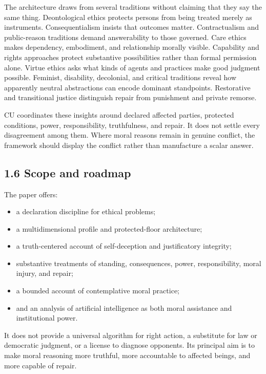 \documentclass[
  11pt,
]{article}
\providecommand{\tightlist}{%
  \setlength{\itemsep}{0pt}\setlength{\parskip}{0pt}}
\begin{document}
The architecture draws from several traditions without claiming that
they say the same thing. Deontological ethics protects persons from
being treated merely as instruments. Consequentialism insists that
outcomes matter. Contractualism and public-reason traditions demand
answerability to those governed. Care ethics makes dependency,
embodiment, and relationship morally visible. Capability and rights
approaches protect substantive possibilities rather than formal
permission alone. Virtue ethics asks what kinds of agents and practices
make good judgment possible. Feminist, disability, decolonial, and
critical traditions reveal how apparently neutral abstractions can
encode dominant standpoints. Restorative and transitional justice
distinguish repair from punishment and private remorse.

CU coordinates these insights around declared affected parties,
protected conditions, power, responsibility, truthfulness, and repair.
It does not settle every disagreement among them. Where moral reasons
remain in genuine conflict, the framework should display the conflict
rather than manufacture a scalar answer.

\subsection{1.6 Scope and roadmap}\label{scope-and-roadmap}

The paper offers:

\begin{itemize}
\tightlist
\item
  a declaration discipline for ethical problems;
\item
  a multidimensional profile and protected-floor architecture;
\item
  a truth-centered account of self-deception and justificatory
  integrity;
\item
  substantive treatments of standing, consequences, power,
  responsibility, moral injury, and repair;
\item
  a bounded account of contemplative moral practice;
\item
  and an analysis of artificial intelligence as both moral assistance
  and institutional power.
\end{itemize}

It does not provide a universal algorithm for right action, a substitute
for law or democratic judgment, or a license to diagnose opponents. Its
principal aim is to make moral reasoning more truthful, more accountable
to affected beings, and more capable of repair.
\end{document}
